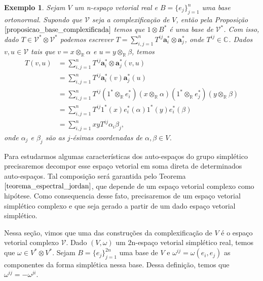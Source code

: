 \documentclass[12pt]{book}
\newtheorem{exemplo}[teorema]{Exemplo}
\newcommand{\colecaofinita}[2]{\{#1_{j} \}_{j=1}^{#2}}
\newcommand{\complexificado}[1]{\mathcal{#1}}
\newcommand{\complexificacaoelemento}[2]{#1\otimes_{\reta} #2}
\newcommand{\complexo}[1]{\mathbb{C}^{#1}}
\newcommand{\produtotensorialabrev}[2]{#1\otimes #2}
\newcommand{\produtotensorialdual}{\produtotensorialabrev{\complexificado{V}^{*}}{\complexificado{V}^{*}}}
\newcommand{\real}[1]{\mathbb{R}^{#1}}
\newcommand{\reta}{\real{}}
\begin{document}
	\begin{exemplo}\label{exemplo_complexificacao_tensorial}
		Sejam $V$ um n-espaço vetorial real e $B = \colecaofinita{e}{n}$ uma base ortonormal. Supondo que $\complexificado{V}$ seja a complexificação de $V$, então pela Proposição $\ref{proposicao_base_complexificada}$ temos que $1\otimes B^{*}$ é uma base de $\complexificado{V}^{*}$. Com isso, dado $T \in \produtotensorialdual$ podemos escrever $T = \sum_{i,j = 1}^{n} T^{ij}\textbf{a}^{*}_{i}\otimes \textbf{a}^{*}_{j}$, onde $T^{ij} \in \complexo{}$. Dados $v, u\in \complexificado{V}$ tais que $v=\complexificacaoelemento{x}{\alpha}$ e $u=\complexificacaoelemento{y}{\beta}$, temos
		$$
		\begin{aligned}
		T(v,u) &= \sum_{i,j = 1}^{n}
		T^{ij}\textbf{a}^{*}_{i}\otimes \textbf{a}^{*}_{j}(v,u)
		\\
		&= \sum_{i,j = 1}^{n}
		T^{ij}\textbf{a}^{*}_{i}(v)\textbf{a}^{*}_{j}(u)
		\\
		&= \sum_{i,j = 1}^{n}
		T^{ij}(\complexificacaoelemento{1^{*}}{e^{*}_{i}})(\complexificacaoelemento{x}{\alpha})(\complexificacaoelemento{1^{*}}{e^{*}_{j}})(\complexificacaoelemento{y}{\beta})
		\\
		&= \sum_{i,j = 1}^{n}
		T^{ij}1^{*}(x)e^{*}_{i}(\alpha)1^{*}(y)e^{*}_{i}(\beta)
		\\
		&= \sum_{i,j = 1}^{n}
		xyT^{ij}\alpha_{i}\beta_{j},
		\end{aligned}
		$$ 
		onde $\alpha_{j}$ e $\beta_{j}$ são as $j$-ésimas coordenadas de $\alpha, \beta \in V$. 
	\end{exemplo}
	
	Para estudarmos algumas características dos auto-espaços do grupo simplético precisaremos decompor esse espaço vetorial em soma direta de determinados  auto-espaços. Tal composição será garantida pelo Teorema $\ref{teorema_espectral_jordan}$, que depende de um espaço vetorial complexo como hipótese. Como consequencia desse fato, precisaremos de um espaço vetorial simplético complexo e que seja gerado a partir de um dado espaço vetorial simplético.
	
	Nessa seção, vimos que uma das construções da complexificação de $V$ é o espaço vetorial complexo $\complexificado{V}$. Dado $(V, \omega)$ um 2n-espaço vetorial simplético real, temos que $\omega \in V^{*}\otimes V^{*}$. Sejam $B = \{e_{j}\}_{j=1}^{2n}$ uma base de $V$ e $\omega^{ij} = \omega(e_{i}, e_{j})$ as componentes da forma simplética nessa base. Dessa definição, temos que $\omega^{ij} = -\omega^{ji}$.
	
\end{document}
